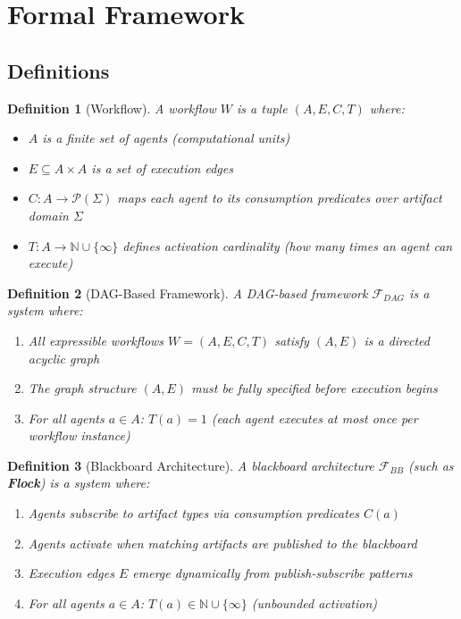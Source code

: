 \documentclass[11pt]{article}
\newtheorem{definition}{Definition}
\begin{document}
\section{Formal Framework}

\subsection{Definitions}

\begin{definition}[Workflow]
A workflow $W$ is a tuple $(A, E, C, T)$ where:
\begin{itemize}
    \item $A$ is a finite set of \emph{agents} (computational units)
    \item $E \subseteq A \times A$ is a set of \emph{execution edges}
    \item $C: A \rightarrow \mathcal{P}(\Sigma)$ maps each agent to its \emph{consumption predicates} over artifact domain $\Sigma$
    \item $T: A \rightarrow \mathbb{N} \cup \{\infty\}$ defines \emph{activation cardinality} (how many times an agent can execute)
\end{itemize}
\end{definition}

\begin{definition}[DAG-Based Framework]
A DAG-based framework $\mathcal{F}_{DAG}$ is a system where:
\begin{enumerate}
    \item All expressible workflows $W = (A, E, C, T)$ satisfy $(A, E)$ is a directed acyclic graph
    \item The graph structure $(A, E)$ must be fully specified before execution begins
    \item For all agents $a \in A$: $T(a) = 1$ (each agent executes at most once per workflow instance)
\end{enumerate}
\end{definition}

\begin{definition}[Blackboard Architecture]
A blackboard architecture $\mathcal{F}_{BB}$ (such as \textbf{Flock}) is a system where:
\begin{enumerate}
    \item Agents subscribe to artifact types via consumption predicates $C(a)$
    \item Agents activate when matching artifacts are published to the blackboard
    \item Execution edges $E$ emerge dynamically from publish-subscribe patterns
    \item For all agents $a \in A$: $T(a) \in \mathbb{N} \cup \{\infty\}$ (unbounded activation)
\end{enumerate}
\end{definition}
\end{document}
